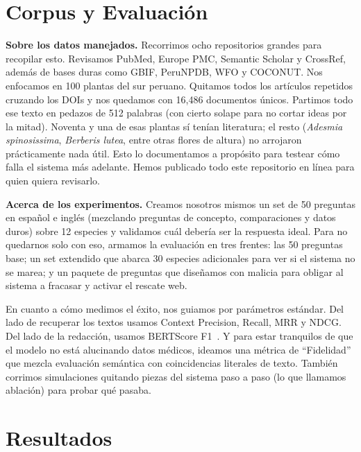\documentclass[runningheads]{llncs}
\begin{document}
\section{Corpus y Evaluaci\'{o}n}
\label{sec:experiments}

\textbf{Sobre los datos manejados.} Recorrimos ocho repositorios grandes para recopilar esto. Revisamos PubMed, Europe PMC, Semantic Scholar y CrossRef, adem\'{a}s de bases duras como GBIF, PeruNPDB, WFO y COCONUT. Nos enfocamos en 100 plantas del sur peruano. Quitamos todos los art\'{i}culos repetidos cruzando los DOIs y nos quedamos con 16{,}486 documentos \'{u}nicos. Partimos todo ese texto en pedazos de 512 palabras (con cierto solape para no cortar ideas por la mitad). Noventa y una de esas plantas s\'{i} ten\'{i}an literatura; el resto (\textit{Adesmia spinosissima}, \textit{Berberis lutea}, entre otras flores de altura) no arrojaron pr\'{a}cticamente nada \'{u}til. Esto lo documentamos a prop\'{o}sito para testear c\'{o}mo falla el sistema m\'{a}s adelante. Hemos publicado todo este repositorio en l\'{i}nea para quien quiera revisarlo.

\textbf{Acerca de los experimentos.} Creamos nosotros mismos un set de 50 preguntas en espa\~{n}ol e ingl\'{e}s (mezclando preguntas de concepto, comparaciones y datos duros) sobre 12 especies y validamos cu\'{a}l deber\'{i}a ser la respuesta ideal. Para no quedarnos solo con eso, armamos la evaluaci\'{o}n en tres frentes: las 50 preguntas base; un set extendido que abarca 30 especies adicionales para ver si el sistema no se marea; y un paquete de preguntas que dise\~{n}amos con malicia para obligar al sistema a fracasar y activar el rescate web.

En cuanto a c\'{o}mo medimos el \'{e}xito, nos guiamos por par\'{a}metros est\'{a}ndar. Del lado de recuperar los textos usamos Context Precision, Recall, MRR y NDCG. Del lado de la redacci\'{o}n, usamos BERTScore F1~\cite{zhang2020bertscore}. Y para estar tranquilos de que el modelo no est\'{a} alucinando datos m\'{e}dicos, ideamos una m\'{e}trica de ``Fidelidad'' que mezcla evaluaci\'{o}n sem\'{a}ntica con coincidencias literales de texto. Tambi\'{e}n corrimos simulaciones quitando piezas del sistema paso a paso (lo que llamamos ablaci\'{o}n) para probar qu\'{e} pasaba.

\section{Resultados}
\label{sec:results}
\end{document}
